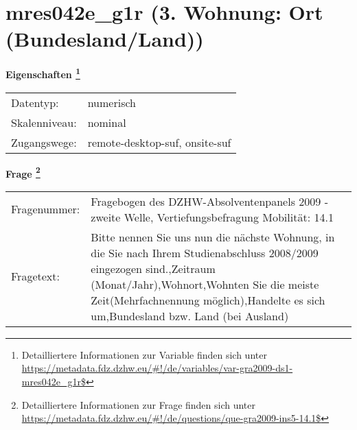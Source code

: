 
    \setcounter{footnote}{0}

    \vspace*{-1.8cm}
	\section{mres042e\_g1r (3. Wohnung: Ort (Bundesland/Land))}
	\label{section:mres042e_g1r}



    \vspace*{0.5cm}
    \noindent\textbf{Eigenschaften
	\footnote{Detailliertere Informationen zur Variable finden sich unter
		\url{https://metadata.fdz.dzhw.eu/\#!/de/variables/var-gra2009-ds1-mres042e_g1r$}}}\\
	\begin{tabularx}{\hsize}{@{}lX}
	Datentyp: & numerisch \\
	Skalenniveau: & nominal \\
	Zugangswege: &
	  remote-desktop-suf, 
	  onsite-suf
 \\
    \end{tabularx}



				\vspace*{0.5cm}
                \noindent\textbf{Frage
	                \footnote{Detailliertere Informationen zur Frage finden sich unter
		              \url{https://metadata.fdz.dzhw.eu/\#!/de/questions/que-gra2009-ins5-14.1$}}}\\
				\begin{tabularx}{\hsize}{@{}lX}
					Fragenummer: &
					  Fragebogen des DZHW-Absolventenpanels 2009 - zweite Welle, Vertiefungsbefragung Mobilität:
					  14.1
 \\
					Fragetext: & Bitte nennen Sie uns nun die nächste Wohnung, in die Sie nach Ihrem Studienabschluss 2008/2009 eingezogen sind.,Zeitraum (Monat/Jahr),Wohnort,Wohnten Sie die meiste Zeit(Mehrfachnennung möglich),Handelte es sich um,Bundesland bzw. Land (bei Ausland) \\
				\end{tabularx}





